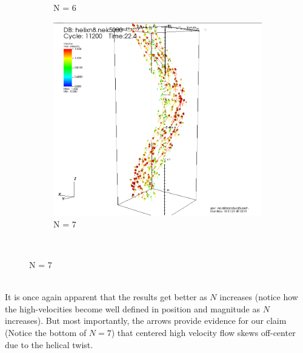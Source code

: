 \documentclass[12pt]{article}
\begin{document}
\begin{figure}[h]
\begin{subfigure}[h]{0.400\textwidth}
		\caption{N = 6}
	\end{subfigure}
	\begin{subfigure}[h]{0.400\textwidth}
		\centering
		\includegraphics[width=\textwidth]{vector8_11200.png}
		\caption{N = 7}
	\end{subfigure}\\ 
\end{figure}\\
It is once again apparent that the results get better as $N$ increases (notice how the high-velocities become well defined in position and magnitude as $N$ increases). But most importantly, the arrows provide evidence for our claim (Notice the bottom of $N=7$) that centered high velocity flow skews off-center due to the helical twist. 
\end{document}
